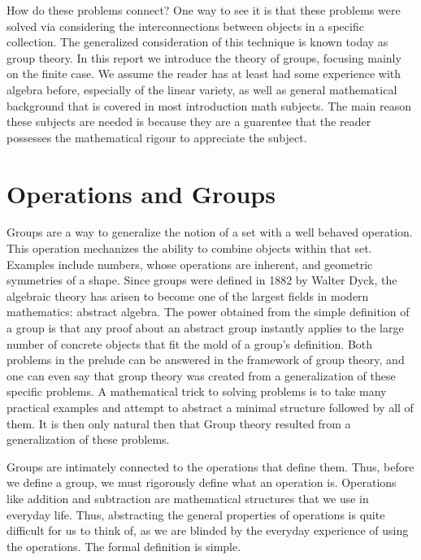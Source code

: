 \documentclass[12pt]{amsbook}
\theoremstyle{plain}
\theoremstyle{definition}
\begin{document}
How do these problems connect? One way to see it is that these problems were solved via considering the interconnections between objects in a specific collection. The generalized consideration of this technique is known today as group theory. In this report we introduce the theory of groups, focusing mainly on the finite case. We assume the reader has at least had some experience with algebra before, especially of the linear variety, as well as general mathematical background that is covered in most introduction math subjects. The main reason these subjects are needed is because they are a guarentee that the reader possesses the mathematical rigour to appreciate the subject.









\chapter{Operations and Groups}

Groups are a way to generalize the notion of a set with a well behaved operation. This operation  mechanizes the ability to combine objects within that set. Examples include numbers, whose operations are inherent, and geometric symmetries of a shape. Since groups were defined in 1882 by Walter Dyck, the algebraic theory has arisen to become one of the largest fields in modern mathematics: abstract algebra. The power obtained from the simple definition of a group is that any proof about an abstract group instantly applies to the large number of concrete objects that fit the mold of a group's definition. Both problems in the prelude can be answered in the framework of group theory, and one can even say that group theory was created from a generalization of these specific problems. A mathematical trick to solving problems is to take many practical examples and attempt to abstract a minimal structure followed by all of them. It is then only natural then that Group theory resulted from a generalization of these problems.

Groups are intimately connected to the operations that define them. Thus, before we define a group, we must rigorously define what an operation is. Operations like addition and subtraction are mathematical structures that we use in everyday life. Thus, abstracting the general properties of operations is quite difficult for us to think of, as we are blinded by the everyday experience of using the operations. The formal definition is simple.
\end{document}
